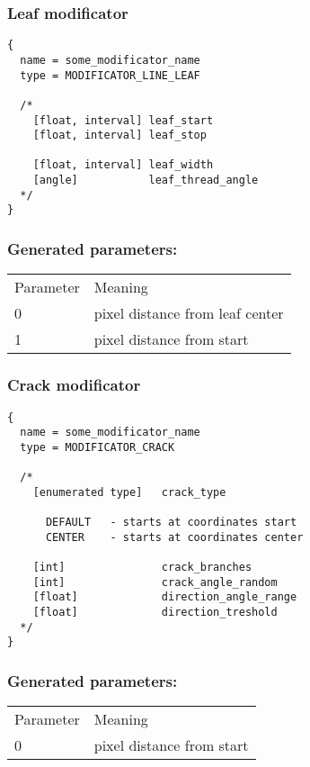 \documentclass[9pt]{article}
\begin{document}
\subsubsection{Leaf modificator}

\begin{verbatim}
{
  name = some_modificator_name
  type = MODIFICATOR_LINE_LEAF

  /*
    [float, interval] leaf_start
    [float, interval] leaf_stop
  
    [float, interval] leaf_width
    [angle]           leaf_thread_angle  
  */
}
\end{verbatim}

\subsubsection*{Generated parameters:}

\begin{tabular}{|l||l|}
  Parameter & Meaning \\
  0 & pixel distance from leaf center \\
  1 & pixel distance from start \\  
\end{tabular}

\subsubsection{Crack modificator}

\begin{verbatim}
{
  name = some_modificator_name
  type = MODIFICATOR_CRACK

  /*
    [enumerated type]   crack_type
  
      DEFAULT   - starts at coordinates start
      CENTER    - starts at coordinates center

    [int]               crack_branches
    [int]               crack_angle_random
    [float]             direction_angle_range
    [float]             direction_treshold
  */
}
\end{verbatim}

\subsubsection*{Generated parameters:}

\begin{tabular}{|l||l|}
  Parameter & Meaning \\
  0 & pixel distance from start \\
\end{tabular}
\end{document}
